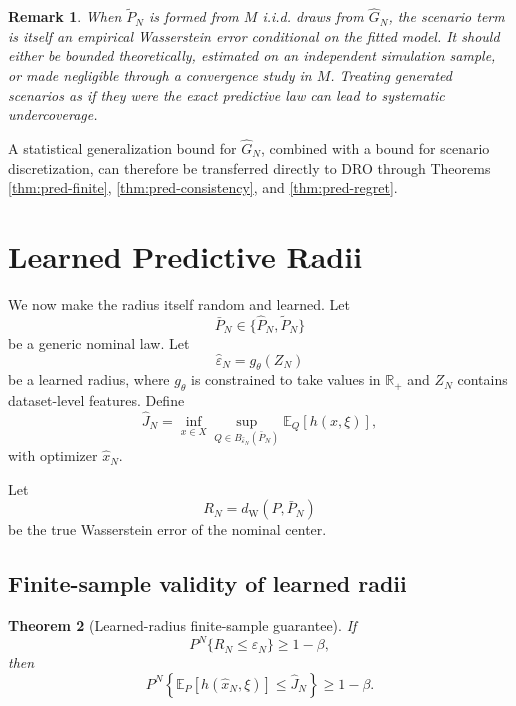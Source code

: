 \documentclass[11pt]{article}
\newtheorem{theorem}{Theorem}[section]
\newtheorem{remark}[theorem]{Remark}
\newcommand{\R}{\mathbb{R}}
\newcommand{\E}{\mathbb{E}}
\newcommand{\1}{\mathbf{1}}
\newcommand{\dW}{d_{\mathrm W}}
\newcommand{\Phat}{\widehat P_N}
\newcommand{\Ptil}{\widetilde P_N}
\newcommand{\Pbar}{\bar P_N}
\newcommand{\epshat}{\widehat\varepsilon_N}
\begin{document}
\begin{remark}
When $\Ptil$ is formed from $M$ i.i.d. draws from $\widehat G_N$, the scenario term is itself an empirical Wasserstein error conditional on the fitted model. It should either be bounded theoretically, estimated on an independent simulation sample, or made negligible through a convergence study in $M$. Treating generated scenarios as if they were the exact predictive law can lead to systematic undercoverage.
\end{remark}

A statistical generalization bound for $\widehat G_N$, combined with a bound for scenario discretization, can therefore be transferred directly to DRO through Theorems \ref{thm:pred-finite}, \ref{thm:pred-consistency}, and \ref{thm:pred-regret}.

\section{Learned Predictive Radii}\label{sec:learned-radius}

We now make the radius itself random and learned. Let
\begin{equation}
    \Pbar\in\{\Phat,\Ptil\}
\end{equation}
be a generic nominal law. Let
\begin{equation}\label{eq:random-radius}
    \epshat=g_\theta(Z_N)
\end{equation}
be a learned radius, where $g_\theta$ is constrained to take values in $\R_+$ and $Z_N$ contains dataset-level features. Define
\begin{equation}\label{eq:learned-radius-dro}
    \widehat J_N=
    \inf_{x\in X}\sup_{Q\in B_{\epshat}(\Pbar)}\E_Q[h(x,\xi)],
\end{equation}
with optimizer $\widehat x_N$.

Let
\begin{equation}\label{eq:Rn-generic}
    R_N=\dW(P,\Pbar)
\end{equation}
be the true Wasserstein error of the nominal center.

\subsection{Finite-sample validity of learned radii}

\begin{theorem}[Learned-radius finite-sample guarantee]\label{thm:learned-radius-finite}
If
\begin{equation}\label{eq:learned-radius-coverage}
    P^N\{R_N\le \epshat\}\ge1-\beta,
\end{equation}
then
\begin{equation}
    P^N\left\{\E_P[h(\widehat x_N,\xi)]\le \widehat J_N\right\}\ge1-\beta.
\end{equation}
\end{theorem}
\end{document}

